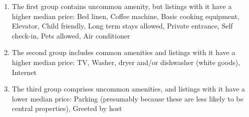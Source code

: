 \begin{enumerate}

  \item The first group contains uncommon amenity, but listings with it have a
    higher median price: Bed linen, Coffee machine, Basic cooking equipment,
    Elevator, Child friendly, Long term stays allowed, Private entrance, Self
check-in, Pets allowed, Air conditioner

  \item The second group includes common amenities and listings with it have a
higher median price: TV, Washer, dryer and/or dishwasher (white goods), Internet

  \item The third group comprises uncommon amenities, and listings with it have
    a lower median price: Parking (presumably because these are less likely to
    be central properties), Greeted by host

\end{enumerate}



